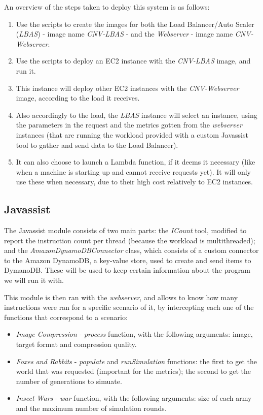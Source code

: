 \documentclass{article}
\begin{document}
An overview of the steps taken to deploy this system is as follows:

\begin{enumerate}
    \item Use the scripts to create the images for both the Load Balancer/Auto
        Scaler (\textit{LBAS}) - image name \textit{CNV-LBAS} - and the
        \textit{Webserver} - image name \textit{CNV-Webserver}.
    \item Use the scripts to deploy an EC2 instance with the \textit{CNV-LBAS}
        image, and run it.
    \item This instance will deploy other EC2 instances with the
        \textit{CNV-Webserver} image, according to the load it receives.
    \item Also accordingly to the load, the \textit{LBAS} instance will select
        an instance, using the parameters in the request and the metrics gotten
        from the \textit{webserver} instances (that are running the workload provided
        with a custom Javassist tool to gather and send data to the Load
        Balancer).
    \item It can also choose to launch a Lambda function, if it deems it
        necessary (like when a machine is starting up and cannot receive
        requests yet). It will only use these when necessary, due to their high
        cost relatively to EC2 instances.
\end{enumerate}

\subsection{Javassist}

The Javassist module consists of two main parts: the \textit{ICount} tool,
modified to report the instruction count per thread (because the workload is
multithreaded); and the \textit{AmazonDynamoDBConnector} class, which consists
of a custom connector to the Amazon DynamoDB, a key-value store, used to create
and send items to DymanoDB. These will be used to keep certain information about
the program we will run it with.

This module is then ran with the \textit{webserver}, and allows to know how many
instructions were ran for a specific scenario of it, by intercepting each one of
the functions that correspond to a scenario:

\begin{itemize}
    \item \textit{Image Compression} - \textit{process} function, with the
        following arguments: image, target format and compression quality.
    \item \textit{Foxes and Rabbits} - \textit{populate} and
        \textit{runSimulation} functions: the first to get the world that was
        requested (important for the metrics); the second to get the number of
        generations to simuate.
    \item \textit{Insect Wars} - \textit{war} function, with the following
        arguments: size of each army and the maximum number of simulation
        rounds.
\end{itemize}
\end{document}
